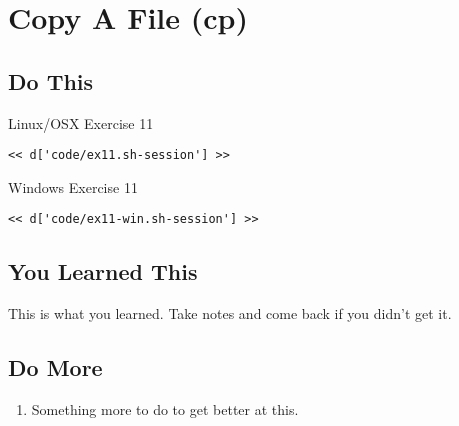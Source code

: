 \chapter{Copy A File (cp)}

\section{Do This}

\begin{code}{Linux/OSX Exercise 11}
\begin{Verbatim}
<< d['code/ex11.sh-session'] >>
\end{Verbatim}
\end{code}

\begin{code}{Windows Exercise 11}
\begin{Verbatim}
<< d['code/ex11-win.sh-session'] >>
\end{Verbatim}
\end{code}

\section{You Learned This}

This is what you learned.  Take notes and come back if you didn't get it.

\section{Do More}

\begin{enumerate}
\item Something more to do to get better at this.
\end{enumerate}

